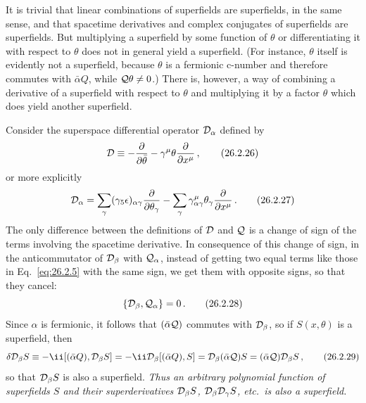 It is trivial that linear combinations of superfields are superfields, in the
same sense, and that spacetime derivatives and complex conjugates of
superfields are superfields. But multiplying a superfield by some function of
$\theta$ or differentiating it with respect to $\theta$ does not in general
yield a superfield. (For instance, $\theta$ itself is evidently not a
superfield, because $\theta$ is a fermionic c-number and therefore commutes
with $\bar\alpha Q$, while $\mathcal{Q}\theta\neq0$.) There is, however, a way of
combining a derivative of a superfield with respect to $\theta$ and
multiplying it by a factor $\theta$ which does yield another superfield.

Consider the superspace differential operator $\mathcal{D}_\alpha$ defined by
\begin{equation}
  \mathcal{D}\equiv
  -\frac{\partial}{\partial\bar\theta}
  -\gamma^\mu\theta\frac{\partial}{\partial x^\mu}\,,
  \tag{26.2.26}\label{eq:26.2.26}
\end{equation}
or more explicitly
\begin{equation}
  \mathcal{D}_\alpha
  =\sum_\gamma(\gamma_5\epsilon)_{\alpha\gamma}
    \frac{\partial}{\partial\theta_\gamma}
  -\sum_\gamma\gamma^\mu_{\alpha\gamma}\theta_\gamma
    \frac{\partial}{\partial x^\mu}\,.
  \tag{26.2.27}\label{eq:26.2.27}
\end{equation}
The only difference between the definitions of $\mathcal{D}$ and $\mathcal{Q}$ is a
change of sign of the terms involving the spacetime derivative. In
consequence of this change of sign, in the anticommutator of $\mathcal{D}_\beta$
with $\mathcal{Q}_\alpha$, instead of getting two equal terms like those in
Eq.~\eqref{eq:26.2.5} with the same sign, we get them with opposite signs, so
that they cancel:
\begin{equation}
  \{\mathcal{D}_\beta,\mathcal{Q}_\alpha\}=0\,.
  \tag{26.2.28}\label{eq:26.2.28}
\end{equation}
Since $\alpha$ is fermionic, it follows that $(\bar\alpha\mathcal{Q})$ commutes
with $\mathcal{D}_\beta$, so if $S(x,\theta)$ is a superfield, then
\begin{equation}
  \delta\SuperD_\beta S
  \equiv-\ii[(\bar\alpha Q),\SuperD_\beta S]
  =-\ii\SuperD_\beta[(\bar\alpha Q),S]
  =\SuperD_\beta(\bar\alpha\SuperQ)S
  =(\bar\alpha\SuperQ)\SuperD_\beta S\,,
  \tag{26.2.29}\label{eq:26.2.29}
\end{equation}
so that $\mathcal{D}_\beta S$ is also a superfield.
\emph{Thus an arbitrary polynomial function of superfields $S$ and their
superderivatives $\mathcal{D}_\beta S$, $\mathcal{D}_\beta\mathcal{D}_\gamma S$, etc.\
is also a superfield.}

